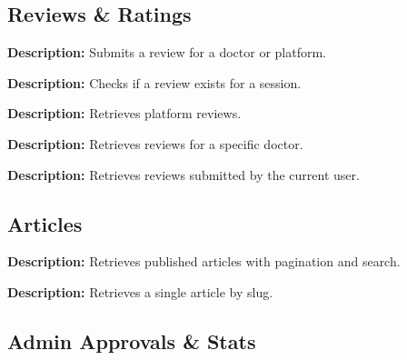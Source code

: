 \documentclass{article}
\begin{document}
\subsection{Reviews \& Ratings}

\begin{tcolorbox}[title=\textcolor{accent}{POST} /api/reviews/submit]
\textbf{Description:} Submits a review for a doctor or platform.
\end{tcolorbox}

\begin{tcolorbox}[title=\textcolor{accent}{GET} /api/reviews/check/:sessionId]
\textbf{Description:} Checks if a review exists for a session.
\end{tcolorbox}

\begin{tcolorbox}[title=\textcolor{accent}{GET} /api/reviews/platform]
\textbf{Description:} Retrieves platform reviews.
\end{tcolorbox}

\begin{tcolorbox}[title=\textcolor{accent}{GET} /api/reviews/doctor/:doctorId]
\textbf{Description:} Retrieves reviews for a specific doctor.
\end{tcolorbox}

\begin{tcolorbox}[title=\textcolor{accent}{GET} /api/reviews/my-reviews]
\textbf{Description:} Retrieves reviews submitted by the current user.
\end{tcolorbox}

\subsection{Articles}

\begin{tcolorbox}[title=\textcolor{accent}{GET} /api/articles]
\textbf{Description:} Retrieves published articles with pagination and search.
\end{tcolorbox}

\begin{tcolorbox}[title=\textcolor{accent}{GET} /api/articles/:slug]
\textbf{Description:} Retrieves a single article by slug.
\end{tcolorbox}

\subsection{Admin Approvals \& Stats}
\end{document}
